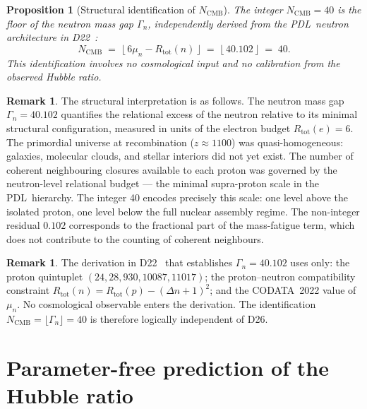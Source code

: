 \documentclass[11pt,a4paper]{article}
\newtheorem{proposition}[theorem]{Proposition}
\theoremstyle{definition}
\newtheorem{remark}[theorem]{Remark}
\newcommand{\PDL}{\textnormal{PDL}}
\newcommand{\Rtot}{R_{\mathrm{tot}}}
\begin{document}
\begin{proposition}[Structural identification of $N_{\mathrm{CMB}}$]
\label{prop:N_CMB}
The integer $N_{\mathrm{CMB}} = 40$ is the floor of the neutron mass gap $\Gamma_n$, independently derived from the \PDL\ neutron architecture in D22~\cite{Nuclear_Stability_PDL_2026}:
\begin{equation}
\label{eq:N_CMB_structural}
N_{\mathrm{CMB}} \;=\; \lfloor\,6\mu_n - \Rtot(n)\,\rfloor \;=\; \lfloor\,40.102\,\rfloor \;=\; 40.
\end{equation}
This identification involves no cosmological input and no calibration from the observed Hubble ratio.
\end{proposition}

\begin{remark}
\label{rem:interpretation}
The structural interpretation is as follows. The neutron mass gap $\Gamma_n = 40.102$ quantifies the relational excess of the neutron relative to its minimal structural configuration, measured in units of the electron budget $\Rtot(e) = 6$. The primordial universe at recombination ($z \approx 1100$) was quasi-homogeneous: galaxies, molecular clouds, and stellar interiors did not yet exist. The number of coherent neighbouring closures available to each proton was governed by the neutron-level relational budget --- the minimal supra-proton scale in the \PDL\ hierarchy. The integer 40 encodes precisely this scale: one level above the isolated proton, one level below the full nuclear assembly regime. The non-integer residual $0.102$ corresponds to the fractional part of the mass-fatigue term, which does not contribute to the counting of coherent neighbours.
\end{remark}

\begin{remark}
\label{rem:independence}
The derivation in D22~\cite{Nuclear_Stability_PDL_2026} that establishes $\Gamma_n = 40.102$ uses only: the proton quintuplet $(24, 28, 930, 10087, 11017)$; the proton--neutron compatibility constraint $\Rtot(n) = \Rtot(p) - (\Delta n+1)^2$; and the CODATA~2022 value of $\mu_n$. No cosmological observable enters the derivation. The identification $N_{\mathrm{CMB}} = \lfloor\Gamma_n\rfloor = 40$ is therefore logically independent of D26.
\end{remark}

\section{Parameter-free prediction of the Hubble ratio}
\label{sec:hubble}
\end{document}
